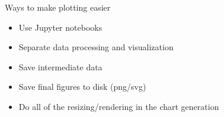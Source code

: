 \documentclass[aspectratio=169]{beamer}
\begin{document}
\begin{frame}{Ways to make plotting easier}
    \begin{itemize}
        \item Use Jupyter notebooks
        \item Separate data processing and visualization
        \item Save intermediate data
        \item Save final figures to disk (png/svg)
        \item Do all of the resizing/rendering in the chart generation
    \end{itemize}
\end{frame}
\end{document}
